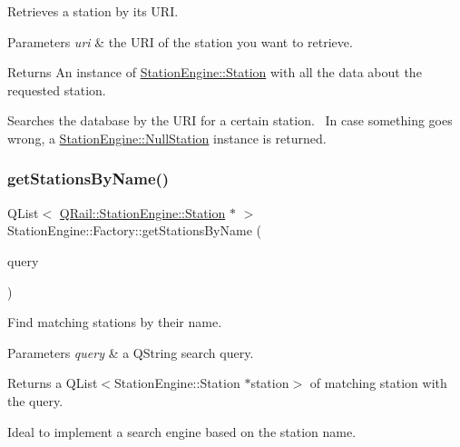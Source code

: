 Retrieves a station by its U\+RI. 


\begin{DoxyParams}{Parameters}
{\em uri} & the U\+RI of the station you want to retrieve. \\
\hline
\end{DoxyParams}
\begin{DoxyReturn}{Returns}
An instance of \mbox{\hyperlink{classQRail_1_1StationEngine_1_1Station}{Station\+Engine\+::\+Station}} with all the data about the requested station.
\end{DoxyReturn}
Searches the database by the U\+RI for a certain station.~\newline
 In case something goes wrong, a \mbox{\hyperlink{classQRail_1_1StationEngine_1_1NullStation}{Station\+Engine\+::\+Null\+Station}} instance is returned. \mbox{\label{classQRail_1_1StationEngine_1_1Factory_a892a259deeb2911edda868a09549b68a}} 
\subsubsection{\texorpdfstring{getStationsByName()}{getStationsByName()}}
{\footnotesize\ttfamily Q\+List$<$ \mbox{\hyperlink{classQRail_1_1StationEngine_1_1Station}{Q\+Rail\+::\+Station\+Engine\+::\+Station}} $\ast$ $>$ Station\+Engine\+::\+Factory\+::get\+Stations\+By\+Name (\begin{DoxyParamCaption}\item[{const Q\+String \&}]{query }\end{DoxyParamCaption})}



Find matching stations by their name. 


\begin{DoxyParams}{Parameters}
{\em query} & a Q\+String search query. \\
\hline
\end{DoxyParams}
\begin{DoxyReturn}{Returns}
a Q\+List$<$\+Station\+Engine\+::\+Station $\ast$station$>$ of matching station with the query.
\end{DoxyReturn}
Ideal to implement a search engine based on the station name. \mbox{\label{classQRail_1_1StationEngine_1_1Factory_aa01df9c015321d15605192969d7d363e}} 

